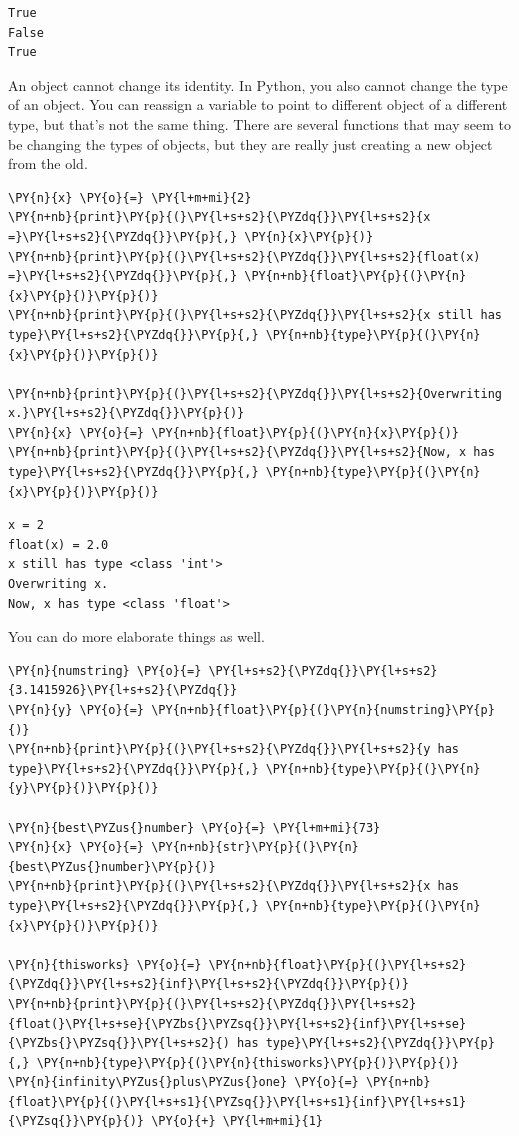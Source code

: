 \begin{Verbatim}
True
False
True
\end{Verbatim}


An object cannot change its identity.
In Python, you also cannot change the type of an object.
You can reassign a variable to point to different object of a different type, but that's not the same thing.
There are several functions that may seem to be changing the types of objects, but they are really just creating a new object from the old.


\begin{Verbatim}[commandchars=\\\{\}]
\PY{n}{x} \PY{o}{=} \PY{l+m+mi}{2}
\PY{n+nb}{print}\PY{p}{(}\PY{l+s+s2}{\PYZdq{}}\PY{l+s+s2}{x =}\PY{l+s+s2}{\PYZdq{}}\PY{p}{,} \PY{n}{x}\PY{p}{)}
\PY{n+nb}{print}\PY{p}{(}\PY{l+s+s2}{\PYZdq{}}\PY{l+s+s2}{float(x) =}\PY{l+s+s2}{\PYZdq{}}\PY{p}{,} \PY{n+nb}{float}\PY{p}{(}\PY{n}{x}\PY{p}{)}\PY{p}{)}
\PY{n+nb}{print}\PY{p}{(}\PY{l+s+s2}{\PYZdq{}}\PY{l+s+s2}{x still has type}\PY{l+s+s2}{\PYZdq{}}\PY{p}{,} \PY{n+nb}{type}\PY{p}{(}\PY{n}{x}\PY{p}{)}\PY{p}{)}

\PY{n+nb}{print}\PY{p}{(}\PY{l+s+s2}{\PYZdq{}}\PY{l+s+s2}{Overwriting x.}\PY{l+s+s2}{\PYZdq{}}\PY{p}{)}
\PY{n}{x} \PY{o}{=} \PY{n+nb}{float}\PY{p}{(}\PY{n}{x}\PY{p}{)}
\PY{n+nb}{print}\PY{p}{(}\PY{l+s+s2}{\PYZdq{}}\PY{l+s+s2}{Now, x has type}\PY{l+s+s2}{\PYZdq{}}\PY{p}{,} \PY{n+nb}{type}\PY{p}{(}\PY{n}{x}\PY{p}{)}\PY{p}{)}
\end{Verbatim}

\begin{Verbatim}
x = 2
float(x) = 2.0
x still has type <class 'int'>
Overwriting x.
Now, x has type <class 'float'>
\end{Verbatim}


You can do more elaborate things as well.


\begin{Verbatim}[commandchars=\\\{\}]
\PY{n}{numstring} \PY{o}{=} \PY{l+s+s2}{\PYZdq{}}\PY{l+s+s2}{3.1415926}\PY{l+s+s2}{\PYZdq{}}
\PY{n}{y} \PY{o}{=} \PY{n+nb}{float}\PY{p}{(}\PY{n}{numstring}\PY{p}{)}
\PY{n+nb}{print}\PY{p}{(}\PY{l+s+s2}{\PYZdq{}}\PY{l+s+s2}{y has type}\PY{l+s+s2}{\PYZdq{}}\PY{p}{,} \PY{n+nb}{type}\PY{p}{(}\PY{n}{y}\PY{p}{)}\PY{p}{)}

\PY{n}{best\PYZus{}number} \PY{o}{=} \PY{l+m+mi}{73}
\PY{n}{x} \PY{o}{=} \PY{n+nb}{str}\PY{p}{(}\PY{n}{best\PYZus{}number}\PY{p}{)}
\PY{n+nb}{print}\PY{p}{(}\PY{l+s+s2}{\PYZdq{}}\PY{l+s+s2}{x has type}\PY{l+s+s2}{\PYZdq{}}\PY{p}{,} \PY{n+nb}{type}\PY{p}{(}\PY{n}{x}\PY{p}{)}\PY{p}{)}

\PY{n}{thisworks} \PY{o}{=} \PY{n+nb}{float}\PY{p}{(}\PY{l+s+s2}{\PYZdq{}}\PY{l+s+s2}{inf}\PY{l+s+s2}{\PYZdq{}}\PY{p}{)}
\PY{n+nb}{print}\PY{p}{(}\PY{l+s+s2}{\PYZdq{}}\PY{l+s+s2}{float(}\PY{l+s+se}{\PYZbs{}\PYZsq{}}\PY{l+s+s2}{inf}\PY{l+s+se}{\PYZbs{}\PYZsq{}}\PY{l+s+s2}{) has type}\PY{l+s+s2}{\PYZdq{}}\PY{p}{,} \PY{n+nb}{type}\PY{p}{(}\PY{n}{thisworks}\PY{p}{)}\PY{p}{)}
\PY{n}{infinity\PYZus{}plus\PYZus{}one} \PY{o}{=} \PY{n+nb}{float}\PY{p}{(}\PY{l+s+s1}{\PYZsq{}}\PY{l+s+s1}{inf}\PY{l+s+s1}{\PYZsq{}}\PY{p}{)} \PY{o}{+} \PY{l+m+mi}{1}
\end{Verbatim}

